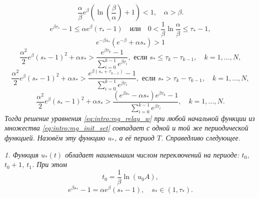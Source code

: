 \begin{equation}
	\label{eq:intro:cond_thm1}
	\frac{\alpha}{\beta}e^{\beta}\left(\ln\left(\frac{\beta}{\alpha}\right)+1\right) < 1,
	\quad
	\alpha > \beta.
\end{equation}
%
\begin{equation}
	\label{eq:intro:cond_thm2}
	e^{\beta \tau_*}-1 \leqslant \alpha e^\beta(\tau_*-1)
	\quad\text{или}\quad
	0 < \frac{1}{\beta}\ln\frac{\alpha}{\beta}\leqslant\tau_*-1,
\end{equation}
%
\begin{equation}
	\label{eq:intro:cond_th_w>1_t_1+1}
	e^{-\beta s_*}(e^{-\beta}+\alpha s_*)>1
\end{equation}
%
\begin{equation}
	\label{eq:intro:cond_hair_hair_01}
	\frac{\alpha^2}{2}e^\beta(s_*-1)^2+\alpha s_*>\frac{e^{\beta \tau_k}-1}{\sum_{i=0}^{k-1}e^{\beta \tau_i}},\text{ если } s_*\leqslant \tau_k-\tau_{k-1},\quad k=1,\ldots,N,
\end{equation}
%
\begin{equation}
	\label{eq:intro:cond_hair_hair_02}
	\frac{\alpha^2}{2}e^\beta(s_*-1)^2+\alpha s_*>\frac{e^{\beta (s_*+\tau_{k-1})}-1}{\sum_{i=0}^{k-1}e^{\beta \tau_i}},\text{ если } s_* > \tau_k-\tau_{k-1},\quad k=1,\ldots,N,
\end{equation}
%
\begin{equation}
	\label{eq:intro:cond_hair_hair_1}
	\frac{\alpha^2}{2}e^\beta( s_*-1)^2+\alpha s_*>\frac{(e^{\beta s_*}-\alpha s_*)e^{\beta \tau_k}-1}{\sum_{i=0}^{k-1}e^{\beta \tau_i}},\quad k=1,\ldots,N.
\end{equation}
\textit{Тогда решение уравнения \eqref{eq:intro:mg_relay_w} при любой начальной функции из множества \eqref{eq:intro:mg_init_set} совпадает с одной и той же периодической функцией. Назовём эту функцию $u_*$, а её период $T$. Справедливо следующее.}

\textit{1. Функция $u_*(t)$ обладает наименьшим числом переключений на периоде: $t_0$, $t_0+1$, $t_1$. При этом }
%
\begin{equation*}
	t_0=\frac{1}{\beta}\ln(u_0 A),
\end{equation*}
\begin{equation}
	e^{\beta s_*} - 1=\alpha e^{\beta}(s_* - 1), \quad s_* \in (1, \tau_*).
\end{equation}

